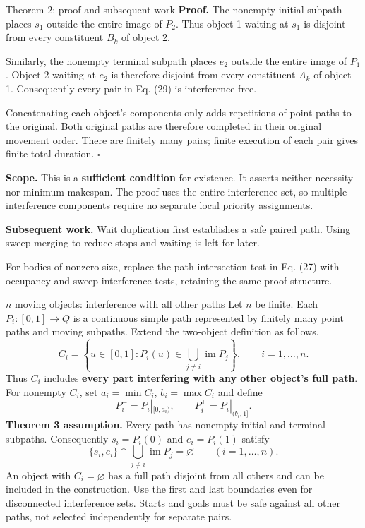 \begin{frame}{Theorem 2: proof and subsequent work}
\small
\textbf{Proof.} The nonempty initial subpath places $s_1$ outside the entire image of $P_2$.
Thus object 1 waiting at $s_1$ is disjoint from every constituent $B_k$ of object 2.
\par\medskip
Similarly, the nonempty terminal subpath places $e_2$ outside the entire image of $P_1$.
Object 2 waiting at $e_2$ is therefore disjoint from every constituent $A_k$ of object 1.
Consequently every pair in Eq. (29) is interference-free.
\par\medskip
Concatenating each object's components only adds repetitions of point paths to the original.
Both original paths are therefore completed in their original movement order.
There are finitely many pairs; finite execution of each pair gives finite total duration.
\hfill$\square$
\par\medskip
\textbf{Scope.} This is a \textbf{sufficient condition} for existence.
It asserts neither necessity nor minimum makespan. The proof uses the entire interference set,
so multiple interference components require no separate local priority assignments.
\par\medskip
\textbf{Subsequent work.} Wait duplication first establishes a safe paired path.
Using sweep merging to reduce stops and waiting is left for later.
\par\smallskip\footnotesize
For bodies of nonzero size, replace the path-intersection test in Eq. (27) with occupancy and
sweep-interference tests, retaining the same proof structure.
\end{frame}

\begin{frame}{$n$ moving objects: interference with all other paths}
\small
Let $n$ be finite. Each $P_i:[0,1]\to Q$ is a continuous simple path represented by finitely many
point paths and moving subpaths. Extend the two-object definition as follows.
\begin{equation}
 C_i=\left\{u\in[0,1]:P_i(u)\in
 \bigcup_{j\ne i}\operatorname{im}P_j\right\},
 \qquad i=1,\ldots,n.
 \tag{30}
\end{equation}
Thus $C_i$ includes \textbf{every part interfering with any other object's full path}.
For nonempty $C_i$, set $a_i=\min C_i$, $b_i=\max C_i$ and define
\begin{equation}
 P_i^-=P_i|_{[0,a_i)},\qquad P_i^+=P_i|_{(b_i,1]}.
 \tag{31}
\end{equation}
\textbf{Theorem 3 assumption.} Every path has nonempty initial and terminal subpaths.
Consequently $s_i=P_i(0)$ and $e_i=P_i(1)$ satisfy
\begin{equation}
 \{s_i,e_i\}\cap\bigcup_{j\ne i}\operatorname{im}P_j=\varnothing
 \qquad(i=1,\ldots,n).
 \tag{32}
\end{equation}
\footnotesize An object with $C_i=\varnothing$ has a full path disjoint from all others and can be
included in the construction. Use the first and last boundaries even for disconnected interference sets.
Starts and goals must be safe against all other paths, not selected independently for separate pairs.
\end{frame}

